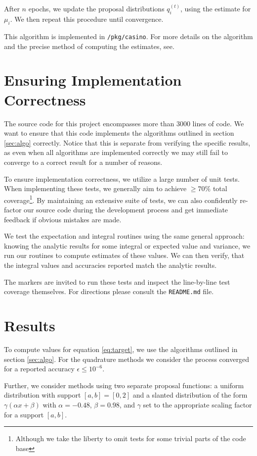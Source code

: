 \documentclass[10pt, a4paper]{article}
\begin{document}
  After $n$ epochs, we update the proposal distributions $q_i^{(t)}$, using the estimate for $\mu_i$.
  We then repeat this procedure until convergence.

  This algorithm is implemented in \texttt{/pkg/casino}. For more details on the algorithm and the
  precise method of computing the estimates, see\cite{apis}.

\section{Ensuring Implementation Correctness}
  The source code for this project encompasses more than $3000$ lines of code. We want to ensure that
  this code implements the algorithms outlined in section \ref{sec:algo} correctly. Notice that this is separate
  from verifying the specific results, as even when all algorithms are implemented correctly we may
  still fail to converge to a correct result for a number of reasons\cite{nr}.

  To ensure implementation correctness, we utilize a large number of unit tests. When implementing these
  tests, we generally aim to achieve $\ge 70\%$ total coverage\footnote{Although we take the liberty
  to omit tests for some trivial parts of the code base}. By maintaining an extensive suite of tests,
  we can also confidently re-factor our source code during the development process and get immediate
  feedback if obvious mistakes are made.

  We test the expectation and integral routines using the same general approach: knowing the analytic
  results for some integral or expected value and variance, we run our routines to compute estimates
  of these values. We can then verify, that the integral values and accuracies reported match the
  analytic results.

  The markers are invited to run these tests and inspect the line-by-line test coverage themselves.
  For directions please consult the \texttt{README.md} file.

\section{Results}
  To compute values for equation \ref{eq:target}, we use the algorithms outlined in section \ref{sec:algo}.
  For the quadrature methods we consider the process converged for a reported accuracy $\epsilon \le 10^{-6}$.

  Further, we consider \is{} methods using two separate proposal functions: a uniform distribution with
  support $[a,b] = [0,2]$ and a slanted distribution of the form $\gamma(\alpha x + \beta)$ with $\alpha = -0.48$,
  $\beta = 0.98$, and $\gamma$ set to the appropriate scaling factor for a support $[a,b]$.
\end{document}
